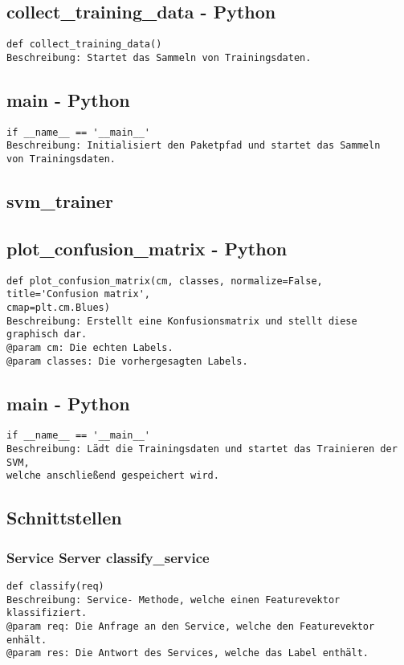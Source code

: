 \documentclass{suturo}
\begin{document}
\subsection{collect\_training\_data - Python}
\begin{verbatim}
def collect_training_data()
Beschreibung: Startet das Sammeln von Trainingsdaten.
\end{verbatim}

\subsection{main - Python}
\begin{verbatim}
if __name__ == '__main__'
Beschreibung: Initialisiert den Paketpfad und startet das Sammeln 
von Trainingsdaten.
\end{verbatim}

\subsection*{svm\_trainer}

\subsection{plot\_confusion\_matrix - Python}
\begin{verbatim}
def plot_confusion_matrix(cm, classes, normalize=False, title='Confusion matrix',
cmap=plt.cm.Blues)
Beschreibung: Erstellt eine Konfusionsmatrix und stellt diese graphisch dar. 
@param cm: Die echten Labels.
@param classes: Die vorhergesagten Labels.
\end{verbatim}

\subsection{main - Python}
\begin{verbatim}
if __name__ == '__main__'
Beschreibung: Lädt die Trainingsdaten und startet das Trainieren der SVM, 
welche anschließend gespeichert wird.
\end{verbatim}

\subsection{Schnittstellen}

\subsubsection{Service Server classify\_service}
\begin{verbatim}
def classify(req)
Beschreibung: Service- Methode, welche einen Featurevektor klassifiziert.
@param req: Die Anfrage an den Service, welche den Featurevektor enhält.  
@param res: Die Antwort des Services, welche das Label enthält.
\end{verbatim}
\end{document}
